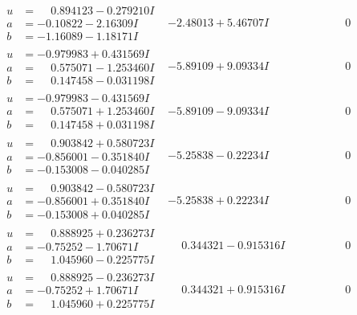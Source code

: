 \documentclass[1p]{elsarticle_modified}
\theoremstyle{definition}
\begin{document}
$$\begin{array}{c|c|c}
\begin{aligned}
u &= \phantom{-}0.894123 - 0.279210 I \\
a &= -0.10822 - 2.16309 I \\
b &= -1.16089 - 1.18171 I\end{aligned}
 & -2.48013 + 5.46707 I & \phantom{-0.000000 } 0 \\ \hline\begin{aligned}
u &= -0.979983 + 0.431569 I \\
a &= \phantom{-}0.575071 - 1.253460 I \\
b &= \phantom{-}0.147458 - 0.031198 I\end{aligned}
 & -5.89109 + 9.09334 I & \phantom{-0.000000 } 0 \\ \hline\begin{aligned}
u &= -0.979983 - 0.431569 I \\
a &= \phantom{-}0.575071 + 1.253460 I \\
b &= \phantom{-}0.147458 + 0.031198 I\end{aligned}
 & -5.89109 - 9.09334 I & \phantom{-0.000000 } 0 \\ \hline\begin{aligned}
u &= \phantom{-}0.903842 + 0.580723 I \\
a &= -0.856001 - 0.351840 I \\
b &= -0.153008 - 0.040285 I\end{aligned}
 & -5.25838 - 0.22234 I & \phantom{-0.000000 } 0 \\ \hline\begin{aligned}
u &= \phantom{-}0.903842 - 0.580723 I \\
a &= -0.856001 + 0.351840 I \\
b &= -0.153008 + 0.040285 I\end{aligned}
 & -5.25838 + 0.22234 I & \phantom{-0.000000 } 0 \\ \hline\begin{aligned}
u &= \phantom{-}0.888925 + 0.236273 I \\
a &= -0.75252 - 1.70671 I \\
b &= \phantom{-}1.045960 - 0.225775 I\end{aligned}
 & \phantom{-}0.344321 - 0.915316 I & \phantom{-0.000000 } 0 \\ \hline\begin{aligned}
u &= \phantom{-}0.888925 - 0.236273 I \\
a &= -0.75252 + 1.70671 I \\
b &= \phantom{-}1.045960 + 0.225775 I\end{aligned}
 & \phantom{-}0.344321 + 0.915316 I & \phantom{-0.000000 } 0 \\ \hline\begin{aligned}

\end{aligned}
\end{array}$$
\end{document}
